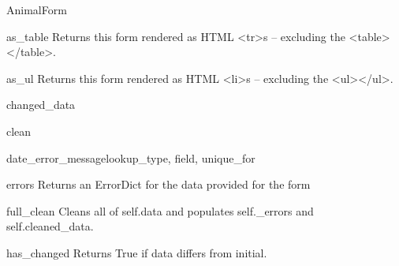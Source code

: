 \documentclass[letterpaper,10pt,english]{sphinxmanual}
\begin{document}
\begin{classdesc}{AnimalForm}
\hypertarget{animal.forms.AnimalForm.as_table}{}\begin{methoddesc}[AnimalForm]{as\_table}{}
Returns this form rendered as HTML \textless{}tr\textgreater{}s -- excluding the \textless{}table\textgreater{}\textless{}/table\textgreater{}.
\end{methoddesc}

\hypertarget{animal.forms.AnimalForm.as_ul}{}\begin{methoddesc}[AnimalForm]{as\_ul}{}
Returns this form rendered as HTML \textless{}li\textgreater{}s -- excluding the \textless{}ul\textgreater{}\textless{}/ul\textgreater{}.
\end{methoddesc}

\hypertarget{animal.forms.AnimalForm.changed_data}{}\begin{memberdesc}[AnimalForm]{changed\_data}\end{memberdesc}

\hypertarget{animal.forms.AnimalForm.clean}{}\begin{methoddesc}[AnimalForm]{clean}{}\end{methoddesc}

\hypertarget{animal.forms.AnimalForm.date_error_message}{}\begin{methoddesc}[AnimalForm]{date\_error\_message}{lookup\_type, field, unique\_for}\end{methoddesc}

\hypertarget{animal.forms.AnimalForm.errors}{}\begin{memberdesc}[AnimalForm]{errors}
Returns an ErrorDict for the data provided for the form
\end{memberdesc}

\hypertarget{animal.forms.AnimalForm.full_clean}{}\begin{methoddesc}[AnimalForm]{full\_clean}{}
Cleans all of self.data and populates self.\_errors and
self.cleaned\_data.
\end{methoddesc}

\hypertarget{animal.forms.AnimalForm.has_changed}{}\begin{methoddesc}[AnimalForm]{has\_changed}{}
Returns True if data differs from initial.
\end{methoddesc}


\end{classdesc}
\end{document}
